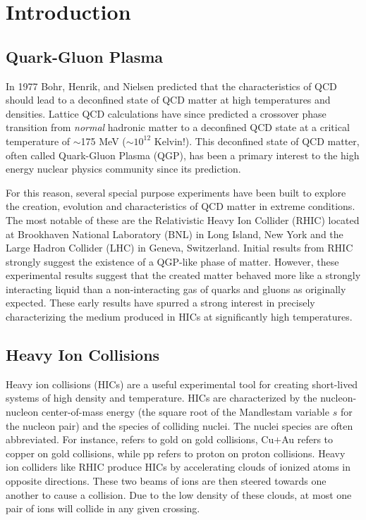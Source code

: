 \section{Introduction}

	\subsection{Quark-Gluon Plasma}
	\label{sec:qgp}
	In 1977 Bohr, Henrik, and Nielsen predicted that the characteristics of QCD should lead to a deconfined state of QCD matter at high temperatures and densities\cite{bohr_hadron_1977}.  Lattice QCD calculations have since predicted a crossover phase transition from \textit{normal} hadronic matter to a deconfined QCD state at a critical temperature of $\sim$175 MeV ($\sim10^{12}$ Kelvin!)\cite{karsch_phase_1995}. This deconfined state of QCD matter, often called Quark-Gluon Plasma (QGP), has been a primary interest to the high energy nuclear physics community since its prediction. 

	For this reason, several special purpose experiments have been built to explore the creation, evolution and characteristics of QCD matter in extreme conditions. The most notable of these are the Relativistic Heavy Ion Collider (RHIC) located at Brookhaven National Laboratory (BNL) in Long Island, New York and the Large Hadron Collider (LHC) in Geneva, Switzerland. Initial results from RHIC strongly suggest the existence of a QGP-like phase of matter. However, these experimental results suggest that the created matter behaved more like a strongly interacting liquid than a non-interacting gas of quarks and gluons as originally expected\cite{bohr_hadron_1977}. These early results have spurred a strong interest in precisely characterizing the medium produced in HICs at significantly high temperatures. 

	\subsection{Heavy Ion Collisions}
	\label{sec:hic}
	Heavy ion collisions (HICs) are a useful experimental tool for creating short-lived systems of high density and temperature. HICs are characterized by the nucleon-nucleon center-of-mass energy \snn (the square root of the Mandlestam variable $s$ for the nucleon pair) and the species of colliding nuclei. The nuclei species are often abbreviated. For instance, \auau refers to gold on gold collisions, Cu$+$Au refers to copper on gold collisions, while pp refers to proton on proton collisions. Heavy ion colliders like RHIC produce HICs by accelerating clouds of ionized atoms in opposite directions. These two beams of ions are then steered towards one another to cause a collision. Due to the low density of these clouds, at most one pair of ions will collide in any given crossing. 

